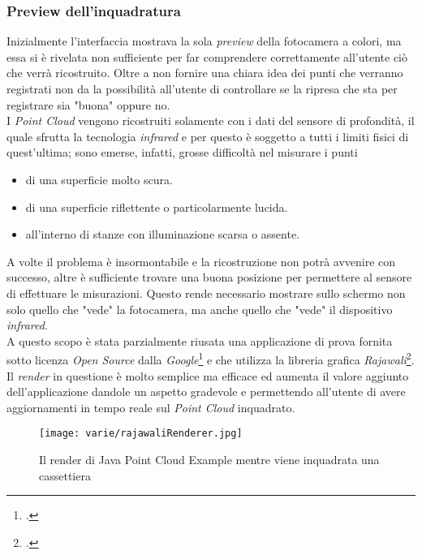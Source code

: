 \subsubsection{Preview dell'inquadratura}
\label{cap:frame_preview}
Inizialmente l'interfaccia mostrava la sola \emph{preview} della fotocamera a colori, ma essa si è rivelata non sufficiente per far comprendere correttamente all'utente ciò che verrà ricostruito. Oltre a non fornire una chiara idea dei punti che verranno registrati non da la possibilità all'utente di controllare se la ripresa che sta per registrare sia "buona" oppure no.\\
I \emph{Point Cloud} vengono ricostruiti solamente con i dati del sensore di profondità, il quale sfrutta la tecnologia \emph{infrared} e per questo è soggetto a tutti i limiti fisici di quest'ultima; sono emerse, infatti, grosse difficoltà nel misurare i punti
\begin{itemize}
	\item di una superficie molto scura.
	\item di una superficie riflettente o particolarmente lucida.
	\item all'interno di stanze con illuminazione scarsa o assente.
\end{itemize}
A volte il problema è insormontabile e la ricostruzione non potrà avvenire con successo, altre è sufficiente trovare una buona posizione per permettere al sensore di effettuare le misurazioni. Questo rende necessario mostrare sullo schermo non solo quello che "vede" la fotocamera, ma anche quello che "vede" il dispositivo \emph{infrared}.\\
A questo scopo è stata parzialmente riusata una applicazione di prova fornita sotto licenza \emph{Open Source} dalla \emph{Google}\footcite{GitHub: https://github.com/googlesamples/tango-examples-java} e che utilizza la libreria grafica \emph{Rajawali}\footcite{GitHub: https://github.com/Rajawali/Rajawali}.\\
Il \emph{render} in questione è molto semplice ma efficace ed aumenta il valore aggiunto dell'applicazione dandole un aspetto gradevole e permettendo all'utente di avere aggiornamenti in tempo reale sul \emph{Point Cloud} inquadrato.
\begin{figure}[H] 
    \centering 
    \texttt{[image: varie/rajawaliRenderer.jpg]} 
    \caption{Il render di Java Point Cloud Example mentre viene inquadrata una cassettiera}
\end{figure}


